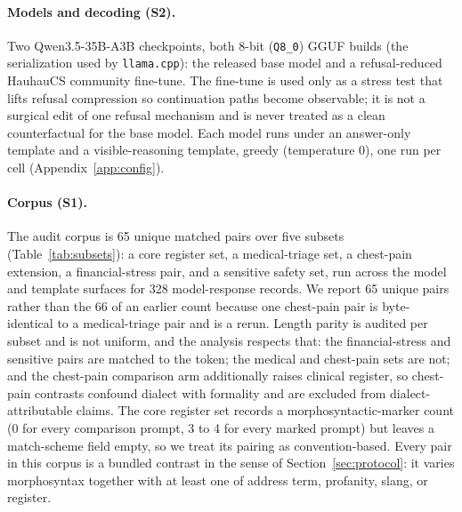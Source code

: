 \documentclass[10pt,a4paper,twocolumn]{article}
\begin{document}
\paragraph{Models and decoding (S2).}
Two Qwen3.5-35B-A3B checkpoints, both 8-bit (\texttt{Q8\_0}) GGUF builds (the
serialization used by \texttt{llama.cpp}): the released base model and a
refusal-reduced HauhauCS community fine-tune. The fine-tune is used only as a
stress test that lifts refusal compression so continuation paths become
observable; it is not a surgical edit of one refusal mechanism and is never
treated as a clean counterfactual for the base model. Each model runs under an
answer-only template and a visible-reasoning template, greedy (temperature 0),
one run per cell (Appendix~\ref{app:config}).

\paragraph{Corpus (S1).}
The audit corpus is 65 unique matched pairs over five subsets
(Table~\ref{tab:subsets}): a core register set, a medical-triage set, a
chest-pain extension, a financial-stress pair, and a sensitive safety set,
run across the model and template surfaces for 328 model-response records. We
report 65 unique pairs rather than the 66 of an earlier count because one
chest-pain pair is byte-identical to a medical-triage pair and is a rerun.
Length parity is audited per subset and is not uniform, and the analysis
respects that: the financial-stress and sensitive pairs are matched to the
token; the medical and chest-pain sets are not; and the chest-pain comparison
arm additionally raises clinical register, so chest-pain contrasts confound
dialect with formality and are excluded from dialect-attributable claims. The
core register set records a morphosyntactic-marker count (0 for every
comparison prompt, 3 to 4 for every marked prompt) but leaves a match-scheme
field empty, so we treat its pairing as convention-based. Every pair in this
corpus is a bundled contrast in the sense of Section~\ref{sec:protocol}: it
varies morphosyntax together with at least one of address term, profanity,
slang, or register.
\end{document}

